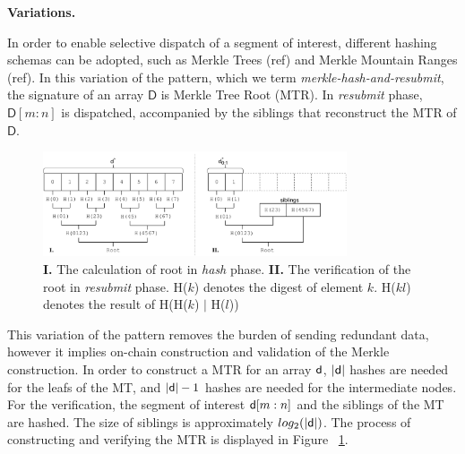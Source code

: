 \noindent \textbf{Variations.}


In order to enable selective dispatch of a segment of interest, different
hashing schemas can be adopted, such as Merkle Trees (ref) and Merkle Mountain
Ranges (ref). In this variation of the pattern, which we term
\emph{merkle-hash-and-resubmit}, the signature of an array $\textsf{D}$ is
Merkle Tree Root (MTR). In \emph{resubmit} phase, $\textsf{D}[m:n]$ is
dispatched, accompanied by the siblings that reconstruct the MTR of
$\textsf{D}$.

\begin{figure}[h]
    \begin{center}
        \includegraphics[width=0.8\textwidth]{figures/merkle-har.pdf}
    \end{center}
    \caption{\textbf{I.} The calculation of root in \emph{hash} phase.
    \textbf{II.} The verification of the root in \emph{resubmit} phase.
    \textsf{H}($k$) denotes the digest of element $k$. \textsf{H}($kl$) denotes the
    result of \textsf{H}(\textsf{H}($k$) $|$ \textsf{H}($l$))
}
    \label{fig:merkle-har}
\end{figure}

This variation of the pattern removes the burden of sending redundant data,
however it implies on-chain construction and validation of the Merkle
construction. In order to construct a MTR for an array $\mathsf{d}$,
$|\mathsf{d}|$ hashes are needed for the leafs of the MT, and $|\mathsf{d}| -
1$ hashes are needed for the intermediate nodes. For the verification, the
segment of interest $\mathsf{d}[m:n]$ and the siblings of the MT are hashed.
The size of siblings is approximately $log_2(|\mathsf{d}|)$. The process of
constructing and verifying the MTR is displayed in Figure
~\ref{fig:merkle-har}.

